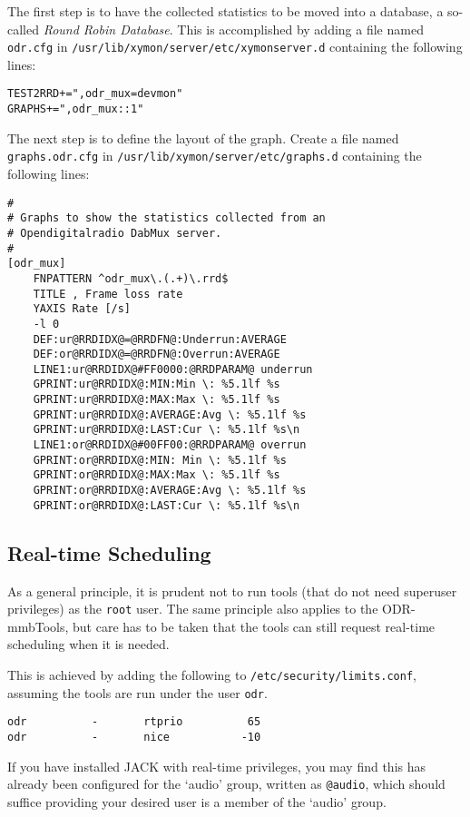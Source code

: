 The first step is to have the collected statistics to be moved into a database,
a so-called \textit{Round Robin Database}. This is accomplished by adding a file
named \verb+odr.cfg+ in \verb+/usr/lib/xymon/server/etc/xymonserver.d+
containing the following lines:

\begin{verbatim}
TEST2RRD+=",odr_mux=devmon"
GRAPHS+=",odr_mux::1"
\end{verbatim}

The next step is to define the layout of the graph.
Create a file named \verb+graphs.odr.cfg+ in
\verb+/usr/lib/xymon/server/etc/graphs.d+ containing the following lines:

\begin{verbatim}
#
# Graphs to show the statistics collected from an
# Opendigitalradio DabMux server.
#
[odr_mux]
	FNPATTERN ^odr_mux\.(.+)\.rrd$
	TITLE , Frame loss rate
	YAXIS Rate [/s]
	-l 0
	DEF:ur@RRDIDX@=@RRDFN@:Underrun:AVERAGE
	DEF:or@RRDIDX@=@RRDFN@:Overrun:AVERAGE
	LINE1:ur@RRDIDX@#FF0000:@RRDPARAM@ underrun
	GPRINT:ur@RRDIDX@:MIN:Min \: %5.1lf %s
	GPRINT:ur@RRDIDX@:MAX:Max \: %5.1lf %s
	GPRINT:ur@RRDIDX@:AVERAGE:Avg \: %5.1lf %s
	GPRINT:ur@RRDIDX@:LAST:Cur \: %5.1lf %s\n
	LINE1:or@RRDIDX@#00FF00:@RRDPARAM@ overrun
	GPRINT:or@RRDIDX@:MIN: Min \: %5.1lf %s
	GPRINT:or@RRDIDX@:MAX:Max \: %5.1lf %s
	GPRINT:or@RRDIDX@:AVERAGE:Avg \: %5.1lf %s
	GPRINT:or@RRDIDX@:LAST:Cur \: %5.1lf %s\n
\end{verbatim}


\subsection{Real-time Scheduling}
As a general principle, it is prudent not to run tools (that do not need superuser
privileges) as the \texttt{root} user. The same principle also applies to the
ODR-mmbTools, but care has to be taken that the tools can still request real-time
scheduling when it is needed.

This is achieved by adding the following to \texttt{/etc/security/limits.conf},
assuming the tools are run under the user \texttt{odr}.

\begin{lstlisting}
odr          -       rtprio          65
odr          -       nice           -10
\end{lstlisting}

If you have installed JACK with real-time privileges, you may find this has
already been configured for the `audio' group, written as \texttt{@audio}, which
should suffice providing your desired user is a member of the `audio' group.

